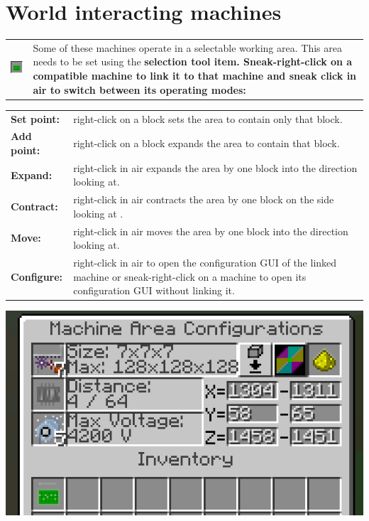\documentclass[11pt]{article} %
\makeatletter
\newcommand{\imgtex}{\begin{tabularx}{\textwidth}{@{}c@{ }X@{}}}
\makeatother
\begin{document}
\section{World interacting machines}
\imgtex
\includegraphics[align = t]{itemSelectionTool} & Some of these machines operate in a selectable working area. This area needs to be set using the \bf selection tool \rm item. Sneak-right-click on a compatible machine to link it to that machine and sneak click in air to switch between its operating modes: \\
\end{tabularx}
\begin{tabularx}{\textwidth}{@{} l @{ } X @{}}
\bf Set point: & \rm right-click on a block sets the area to contain only that block. \\
\bf Add point: & \rm right-click on a block expands the area to contain that block. \\
\bf Expand: & \rm right-click in air expands the area by one block into the direction looking at. \\
\bf Contract: & \rm right-click in air contracts the area by one block on the side looking at . \\
\bf Move: & \rm right-click in air moves the area by one block into the direction looking at. \\
\bf Configure: & \rm right-click in air to open the configuration GUI of the linked machine or sneak-right-click on a machine to open its configuration GUI without linking it. \\
\end{tabularx}
\includegraphics[width = \textwidth]{selectionTool} \\
\end{document}
